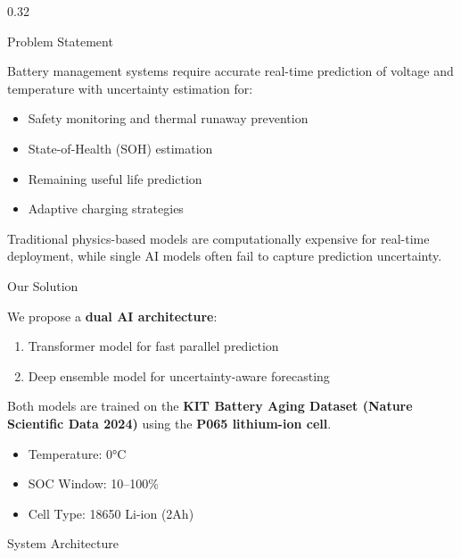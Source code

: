 \documentclass[final]{beamer}
\begin{document}
\begin{frame}[t]
\begin{columns}[t]
\begin{column}{0.32\textwidth}
\begin{block}{Problem Statement}

Battery management systems require accurate real-time prediction of voltage and temperature with uncertainty estimation for:

\begin{itemize}
\item Safety monitoring and thermal runaway prevention
\item State-of-Health (SOH) estimation
\item Remaining useful life prediction
\item Adaptive charging strategies
\end{itemize}

Traditional physics-based models are computationally expensive for real-time deployment, while single AI models often fail to capture prediction uncertainty.

\end{block}

\vspace{1cm}

\begin{alertblock}{Our Solution}

We propose a \textbf{dual AI architecture}:

\begin{enumerate}
\item Transformer model for fast parallel prediction
\item Deep ensemble model for uncertainty-aware forecasting
\end{enumerate}

Both models are trained on the \textbf{KIT Battery Aging Dataset (Nature Scientific Data 2024)} using the \textbf{P065 lithium-ion cell}.

\begin{itemize}
\item Temperature: 0°C
\item SOC Window: 10–100\%
\item Cell Type: 18650 Li-ion (2Ah)
\end{itemize}

\end{alertblock}

\vspace{1cm}

\begin{block}{System Architecture}

\begin{center}


\end{center}
\end{block}
\end{column}
\end{columns}
\end{frame}
\end{document}
